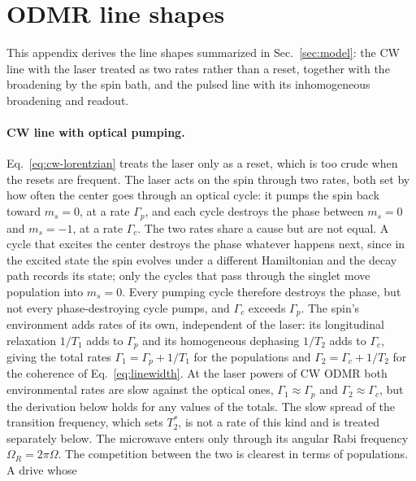 \section{ODMR line shapes}
\label{app:odmr}

This appendix derives the line shapes summarized in Sec.~\ref{sec:model}: the CW line with the laser treated as two
rates rather than a reset, together with the broadening by the spin bath, and the pulsed line with its
inhomogeneous broadening and readout.

\paragraph{CW line with optical pumping.} Eq.~\eqref{eq:cw-lorentzian} treats the laser only as a reset, which is too
crude when the resets are frequent. The laser acts on the spin through two rates, both set by how often the center
goes through an optical cycle: it pumps the spin back toward $m_s=0$, at a rate $\Gamma_p$, and each cycle destroys
the phase between $m_s=0$ and $m_s=-1$, at a rate $\Gamma_c$. The two rates share a cause but are not equal. A cycle
that excites the center destroys the phase whatever happens next, since in the excited state the spin evolves under
a different Hamiltonian and the decay path records its state; only the cycles that pass through the singlet move
population into $m_s=0$. Every pumping cycle therefore destroys the phase, but not every phase-destroying cycle
pumps, and $\Gamma_c$ exceeds $\Gamma_p$.
The spin's environment adds rates of its own, independent of the laser: its longitudinal relaxation $1/T_1$ adds
to $\Gamma_p$ and its homogeneous dephasing $1/T_2$ adds to $\Gamma_c$, giving the total rates
$\Gamma_1=\Gamma_p+1/T_1$ for the populations and $\Gamma_2=\Gamma_c+1/T_2$ for the coherence of
Eq.~\eqref{eq:linewidth}. At the laser powers of CW ODMR both environmental rates are slow against the optical ones,
$\Gamma_1\approx\Gamma_p$ and $\Gamma_2\approx\Gamma_c$, but the derivation below holds for any values of the totals.
The slow spread of the transition frequency, which sets $T_2^*$, is not a rate of this kind and is treated
separately below. The microwave enters only through its angular Rabi
frequency $\Omega_R=2\pi\Omega$. The competition between the two is clearest in terms of populations. A drive whose

